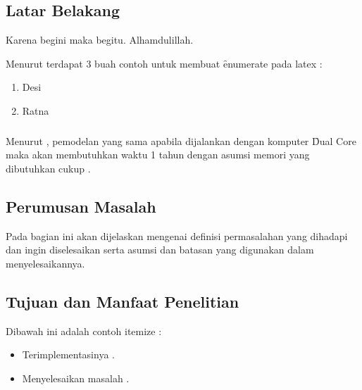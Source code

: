 \chapter{\babSatu}


\section{Latar Belakang}

Karena begini maka begitu. Alhamdulillah.

Menurut \citeauthor{book.pressman} terdapat 3 buah contoh untuk membuat 
\f{enumerate} pada latex \citep{book.pressman}: 
\begin{enumerate}
\item Desi
\item Ratna
\end{enumerate}\paragraph{}

Menurut \cite{ppt.ecmwf}, pemodelan yang sama apabila dijalankan dengan komputer \f{Dual Core} maka akan membutuhkan waktu 1 tahun dengan asumsi memori yang dibutuhkan cukup \citep{ppt.ecmwf}.

\section{Perumusan Masalah}
Pada bagian ini akan dijelaskan mengenai definisi permasalahan yang dihadapi dan ingin diselesaikan serta asumsi dan batasan yang digunakan dalam menyelesaikannya.

\section{Tujuan dan Manfaat Penelitian}
Dibawah ini adalah contoh itemize : 
\begin{itemize}
\item Terimplementasinya .
\item Menyelesaikan masalah .
\end{itemize}
